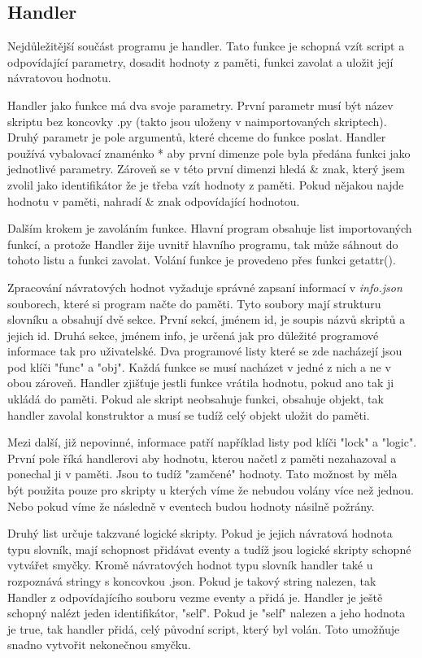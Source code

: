 \documentclass[12pt,a4paper]{article}
\begin{document}
\subsection{Handler}
Nejdůležitější součást programu je handler. Tato funkce je schopná vzít script a odpovídající parametry, dosadit hodnoty z paměti, funkci zavolat a uložit její návratovou hodnotu. 

Handler jako funkce má dva svoje parametry. První parametr musí být název skriptu bez koncovky .py (takto jsou uloženy v naimportovaných skriptech). Druhý parametr je pole argumentů, které chceme do funkce poslat. Handler používá vybalovací znaménko * aby první dimenze pole byla předána funkci jako jednotlivé parametry. Zároveň se v této první dimenzi hledá \& znak, který jsem zvolil jako identifikátor že je třeba vzít hodnoty z paměti. Pokud nějakou najde hodnotu v paměti, nahradí \& znak odpovídající hodnotou.

Dalším krokem je zavoláním funkce. Hlavní program obsahuje list importovaných funkcí, a protože Handler žije uvnitř hlavního programu, tak může sáhnout do tohoto listu a funkci zavolat. Volání funkce je provedeno přes funkci getattr().

Zpracování návratových hodnot vyžaduje správné zapsaní informací v \textit{info.json} souborech, které si program načte do paměti. Tyto soubory mají strukturu slovníku a obsahují dvě sekce. První sekcí, jménem id, je soupis názvů skriptů a jejich id. Druhá sekce, jménem info, je určená jak pro důležité programové informace tak pro uživatelské. Dva programové listy které se zde nacházejí jsou pod klíči "func" a "obj". Každá funkce se musí nacházet v jedné z nich a ne v obou zároveň. Handler zjišťuje jestli funkce vrátila hodnotu, pokud ano tak ji ukládá do paměti. Pokud ale skript neobsahuje funkci, obsahuje objekt, tak handler zavolal konstruktor a musí se tudíž celý objekt uložit do paměti.

Mezi další, již nepovinné, informace patří například listy pod klíči "lock" a "logic". První pole říká handlerovi aby hodnotu, kterou načetl z paměti nezahazoval a ponechal ji v paměti. Jsou to tudíž "zamčené" hodnoty. Tato možnost by měla být použita pouze pro skripty u kterých víme že nebudou volány více než jednou. Nebo pokud víme že následně v eventech budou hodnoty násilně požrány. 

Druhý list určuje takzvané logické skripty. Pokud je jejich návratová hodnota typu slovník, mají schopnost přidávat eventy a tudíž jsou logické skripty schopné vytvářet smyčky. Kromě návratových hodnot typu slovník handler také u rozpoznává stringy s koncovkou .json. Pokud je takový string nalezen, tak Handler z odpovídajícího souboru vezme eventy a přidá je. Handler je ještě schopný nalézt jeden identifikátor, "self". Pokud je "self" nalezen a jeho hodnota je true, tak handler přidá, celý původní script, který byl volán. Toto umožňuje snadno vytvořit nekonečnou smyčku.
\end{document}
